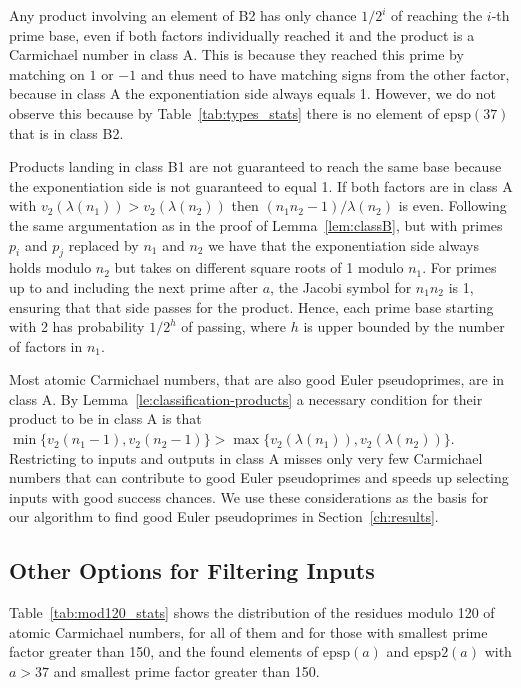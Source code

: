 \documentclass[runningheads]{amsart}
\newcommand{\epsp}{\mathrm{epsp}}
\begin{document}
Any product involving an element of B2 has only chance
$1/2^i$
of reaching the $i$-th prime base,
even if both factors individually reached it and the product is a Carmichael number
in class A.
This is because they reached this prime by matching on $1$ or $-1$ and thus need to
have matching signs from the other factor,
because in class A the exponentiation side always equals 1.
However,
we do not observe this because by
Table~\ref{tab:types_stats}
there is no element of
$\epsp(37)$
that is in class B2.

Products landing in class B1 are not guaranteed to reach the same base because the
exponentiation side is not guaranteed to equal 1.
If both factors are in class A with
$v_2(\lambda(n_1))>v_2(\lambda(n_2))$
then
$(n_1n_2-1)/\lambda(n_2)$
is even.
Following the same argumentation as in the proof of
Lemma~\ref{lem:classB},
but with primes
$p_i$
and
$p_j$
replaced by
$n_1$
and
$n_2$
we have that the exponentiation side always holds modulo
$n_2$
but takes on different square roots of 1 modulo
$n_1$.
For primes up to and including the next prime after $a$,
the Jacobi symbol for
$n_1n_2$
is 1,
ensuring that that side passes for the product.
Hence,
each prime base starting with 2 has probability
$1/2^{h}$
of passing,
where $h$ is upper bounded by the number of factors in
$n_1$.

Most atomic Carmichael numbers,
that are also good Euler pseudoprimes,
are in class A.
By
Lemma~\ref{le:classification-products}
a necessary condition for their product to be in class A is that $
\min\{v_2(n_1
- 1),
v_2(n_2-1)\}
>
\max\{v_2(\lambda(n_1)),
v_2(\lambda(n_2))\}$.
Restricting to inputs and outputs in class A misses only very few Carmichael numbers
that can contribute to good Euler pseudoprimes and speeds up selecting inputs with
good success chances.
We use these considerations as the basis for our algorithm to find good Euler pseudoprimes
in
Section~\ref{ch:results}.
\relax

\relax

\subsection{Other Options for Filtering Inputs}

Table~\ref{tab:mod120_stats}
shows the distribution of the residues modulo 120 of atomic Carmichael numbers,
for all of them and for those with smallest prime factor greater than 150,
and the found elements of
$\epsp(a)$
and
$\epsp2(a)$
with $a
>
37$ and smallest prime factor greater than 150.
\end{document}
